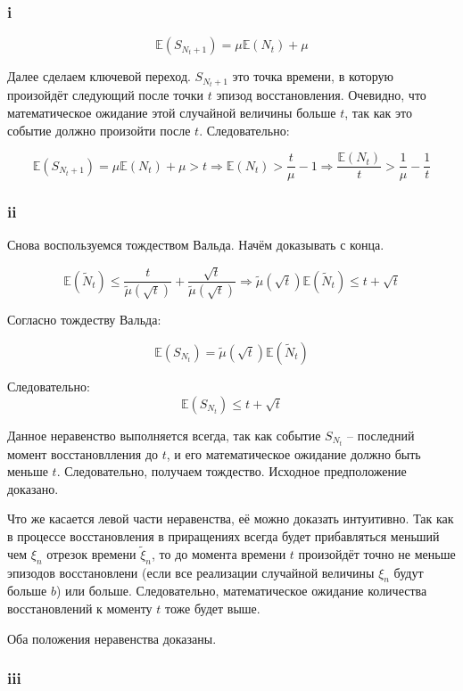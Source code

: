 \documentclass[a4paper,12pt]{article}
\def \mbb{\mathbb}
\def \E{\mbb{E}}
\begin{document}
\subsubsection{i}

\[  \E(S_{N_t+1}) = \mu \E(N_t) + \mu\]

Далее сделаем ключевой переход. $ S_{N_t+1} $ это точка времени, в которую произойдёт следующий после точки $ t $  эпизод восстановления. Очевидно, что математическое ожидание этой случайной величины больше $ t $, так как это событие должно произойти после $ t $. Следовательно:

\[  \E(S_{N_t+1}) = \mu \E(N_t) + \mu > t \Rightarrow \E(N_t) > \frac{t}{\mu} - 1 \Rightarrow \frac{\E(N_t)}{t} > \frac{1}{\mu} - \frac{1}{t}\]

\subsubsection{ii}

Снова воспользуемся тождеством Вальда. Начём доказывать с конца.

\[ \E(\tilde{N}_t)  \le \frac{t}{\tilde{\mu}(\sqrt{t})} + \frac{\sqrt{t}}{\tilde{\mu}(\sqrt{t})} \Rightarrow  \tilde{\mu}(\sqrt{t}) \E(\tilde{N}_t) \le t + \sqrt{t} \]

Согласно тождеству Вальда:

\[ \E(S_{N_t}) =  \tilde{\mu}(\sqrt{t}) \E(\tilde{N}_t) \]


Следовательно:
\[  \E(S_{N_t}) \le t + \sqrt{t}  \]

Данное неравенство выполняется всегда, так как событие $ S_{N_t} $ -- последний момент восстановлления до $ t $, и его математическое ожидание должно быть меньше $ t $. Следовательно, получаем тождество. Исходное предположение доказано.

Что же касается левой части неравенства, её можно доказать интуитивно. Так как в процессе восстановления в приращениях всегда будет прибавляться меньший чем $ \xi_n $ отрезок времени $ \tilde{\xi}_n $, то до момента времени $ t $ произойдёт точно не меньше эпизодов восстановлени (если все реализации случайной величины $ \xi_n $ будут больше $ b $) или больше. Следовательно, математическое ожидание количества восстановлений к моменту $ t $ тоже будет выше. 

Оба положения неравенства доказаны.

\subsubsection{iii}
\end{document}
